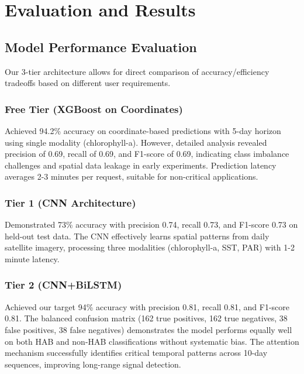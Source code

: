 \documentclass[conference]{IEEEtran}
\begin{document}
\section{Evaluation and Results}

\subsection{Model Performance Evaluation}

Our 3-tier architecture allows for direct comparison of accuracy/efficiency tradeoffs based on different user requirements.

\subsubsection{Free Tier (XGBoost on Coordinates)} Achieved 94.2\% accuracy on coordinate-based predictions with 5-day horizon using single modality (chlorophyll-a). However, detailed analysis revealed precision of 0.69, recall of 0.69, and F1-score of 0.69, indicating class imbalance challenges and spatial data leakage in early experiments. Prediction latency averages 2-3 minutes per request, suitable for non-critical applications.

\subsubsection{Tier 1 (CNN Architecture)} Demonstrated 73\% accuracy with precision 0.74, recall 0.73, and F1-score 0.73 on held-out test data. The CNN effectively learns spatial patterns from daily satellite imagery, processing three modalities (chlorophyll-a, SST, PAR) with 1-2 minute latency.

\subsubsection{Tier 2 (CNN+BiLSTM)} Achieved our target 94\% accuracy with precision 0.81, recall 0.81, and F1-score 0.81. The balanced confusion matrix (162 true positives, 162 true negatives, 38 false positives, 38 false negatives) demonstrates the model performs equally well on both HAB and non-HAB classifications without systematic bias. The attention mechanism successfully identifies critical temporal patterns across 10-day sequences, improving long-range signal detection.
\end{document}
